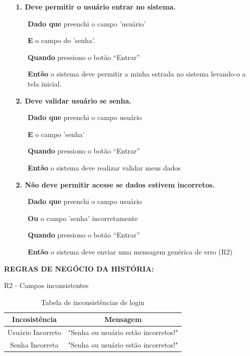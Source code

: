 \begin{itemize}
    \item[] \textbf{1. Deve permitir o usuário entrar no sistema.}

    \begin{itemize}
        \item[\textbf{Dado que}] preenchi o campo 'usuário'
        \item[\textbf{E}] o campo do 'senha'.
        \item[\textbf{Quando}] pressiono o botão ``Entrar''
        \item[\textbf{Então}] o sistema deve permitir a minha estrada no sistema levando-o a tela inicial.
    \end{itemize}

    \item[] \textbf{2. Deve validar usuário se senha.}

    \begin{itemize}
        \item[\textbf{Dado que}] preenchi o campo usuário
        \item[\textbf{E}] o campo 'senha'
        \item[\textbf{Quando}] pressiono o botão ``Entrar''
        \item[\textbf{Então}] o sistema deve realizar validar meus dados
    \end{itemize}

    \item[] \textbf{2. Não deve permitir acesse se dados estivem incorretos.}

    \begin{itemize}
        \item[\textbf{Dado que}] preenchi o campo usuário
        \item[\textbf{Ou}] o campo 'senha' incorretamente
        \item[\textbf{Quando}] pressiono o botão ``Entrar''
        \item[\textbf{Então}] o sistema deve enviar uma mensagem genérica de erro (R2)
    \end{itemize}
\end{itemize}

\textbf{REGRAS DE NEGÓCIO DA HISTÓRIA:}

    R2 - Campos inconsistentes

    \begin{table}[]
        \caption{Tabela de inconsistências de login}
        \centering
        \begin{tabular}{|c|c|}
        \hline
          \textbf{Incosistência}   &  \textbf{Mensagem} \\
        \hline
        Usuário Incorreto   & "Senha ou usuário estão incorretos!" \\
        \hline
        Senha Incorreta   & "Senha ou usuário estão incorretos!" \\
        \hline
        \end{tabular}
        \label{tab:tabela_login}
    \end{table}

